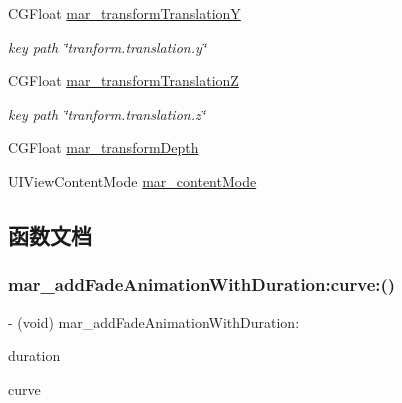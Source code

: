 \begin{DoxyCompactItemize}
C\+G\+Float \hyperlink{category_c_a_layer_07_m_a_r_e_x_08_ac345ca9446a4655624ecae33365e07d6}{mar\+\_\+transform\+TranslationY}
\begin{DoxyCompactList}\small\item\em key path \char`\"{}tranform.\+translation.\+y\char`\"{} \end{DoxyCompactList}\item 
C\+G\+Float \hyperlink{category_c_a_layer_07_m_a_r_e_x_08_abc298f91e907a5d52adacb7c4f8115ac}{mar\+\_\+transform\+TranslationZ}
\begin{DoxyCompactList}\small\item\em key path \char`\"{}tranform.\+translation.\+z\char`\"{} \end{DoxyCompactList}\item 
C\+G\+Float \hyperlink{category_c_a_layer_07_m_a_r_e_x_08_ac936d5c4c1ca01136d172ce405f9cbf0}{mar\+\_\+transform\+Depth}
\item 
U\+I\+View\+Content\+Mode \hyperlink{category_c_a_layer_07_m_a_r_e_x_08_a82f31a35c3c1277d55c74d2faab52e10}{mar\+\_\+content\+Mode}
\end{DoxyCompactItemize}


\subsection{函数文档}
\mbox{\label{category_c_a_layer_07_m_a_r_e_x_08_a3d4a7832d9c52b20d70113e226f6bf15}} 
\subsubsection{\texorpdfstring{mar\+\_\+add\+Fade\+Animation\+With\+Duration\+:curve\+:()}{mar\_addFadeAnimationWithDuration:curve:()}}
{\footnotesize\ttfamily -\/ (void) mar\+\_\+add\+Fade\+Animation\+With\+Duration\+: \begin{DoxyParamCaption}\item[{(N\+S\+Time\+Interval)}]{duration }\item[{curve:(U\+I\+View\+Animation\+Curve)}]{curve }\end{DoxyParamCaption}}

